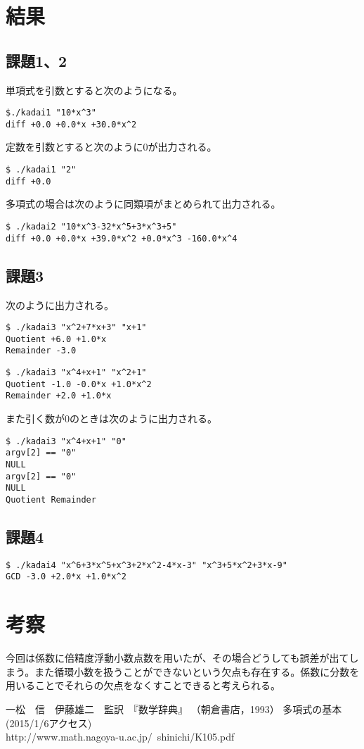 \documentclass{jsarticle}
\begin{document}
\section{結果}
\subsection{課題1、2}
単項式を引数とすると次のようになる。
\begin{verbatim}
$./kadai1 "10*x^3"        
diff +0.0 +0.0*x +30.0*x^2 
\end{verbatim}
定数を引数とすると次のように0が出力される。
\begin{verbatim}
$ ./kadai1 "2"                                                                                                      
diff +0.0
\end{verbatim}
多項式の場合は次のように同類項がまとめられて出力される。
\begin{verbatim}
$ ./kadai2 "10*x^3-32*x^5+3*x^3+5"    
diff +0.0 +0.0*x +39.0*x^2 +0.0*x^3 -160.0*x^4 
\end{verbatim}
\subsection{課題3}
次のように出力される。
\begin{verbatim}
$ ./kadai3 "x^2+7*x+3" "x+1"            
Quotient +6.0 +1.0*x 
Remainder -3.0 
\end{verbatim}
\begin{verbatim}
$ ./kadai3 "x^4+x+1" "x^2+1"         
Quotient -1.0 -0.0*x +1.0*x^2 
Remainder +2.0 +1.0*x
\end{verbatim}
また引く数が0のときは次のように出力される。
\begin{verbatim}
$ ./kadai3 "x^4+x+1" "0"            
argv[2] == "0"
NULL
argv[2] == "0"
NULL
Quotient Remainder
\end{verbatim}

\subsection{課題4}
\begin{verbatim}
$ ./kadai4 "x^6+3*x^5+x^3+2*x^2-4*x-3" "x^3+5*x^2+3*x-9"  
GCD -3.0 +2.0*x +1.0*x^2 
\end{verbatim}
\section{考察}
今回は係数に倍精度浮動小数点数を用いたが、その場合どうしても誤差が出てしまう。また循環小数を扱うことができないという欠点も存在する。係数に分数を用いることでそれらの欠点をなくすことできると考えられる。

\begin{thebibliography}{9}
	一松　信　伊藤雄二　監訳　『数学辞典』
	（朝倉書店，1993）
	多項式の基本 (2015/1/6アクセス) \\
	http://www.math.nagoya-u.ac.jp/~shinichi/K105.pdf
\end{thebibliography}
\end{document}
